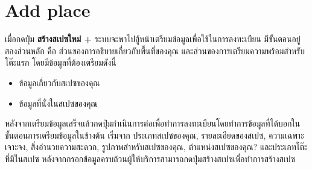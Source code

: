 \section{Add place}
เมื่อกดปุ่ม \textbf{สร้างสเปซใหม่ +} ระบบจะพาไปสู้หน้าเตรียมข้อมูลเพื่อใช้ในการลงทะเบียน มีขั้นตอนอยู่สองส่วนหลัก คือ ส่วนของการอธิบายเกี่ยวกับพื้นที่ของคุณ และส่วนของการเตรียมความพร้อมสำหรับโต๊ะแรก โดยมีข้อมูลที่ต้องเตรียมดังนี้
\begin{itemize}
    \item ข้อมูลเกี่ยวกับสเปซของคุณ
    \item ข้อมูลที่นั่งในสเปซของคุณ
\end{itemize}
หลังจากเตรียมข้อมูลเสร็จแล้วกดปุ่มกำเนินการต่อเพื่อทำการลงทะเบียนโดยทำการข้อมูลที่ได้บอกในขั้นตอนการเตรียมข้อมูลในข้างต้น เริ่มจาก ประเภทสเปซของคุณ, รายละเอียดของสเปซ, ความเฉพาะเจาะจง, สิ่งอำนวยความสะดวก, รูปภาพสำหรับสเปซของคุณ, ตำแหน่งสเปซของคุณ? และประเภทโต๊ะที่มีในสเปซ หลังจากกรอกข้อมูลครบถ้วนผู้ให้บริการสามารถกดปุ่มสร้างสเปซเพื่อทำการสร้างสเปซ

